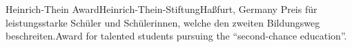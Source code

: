 \begin{cventries}
	{Heinrich-Thein Award}{Heinrich-Thein-Stiftung}{Haßfurt, Germany}%
    {}%
    {Preis für leistungsstarke Schüler und Schülerinnen, welche den zweiten Bildungsweg beschreiten.}{Award for talented students pursuing the ``second-chance education''.}

\end{cventries}